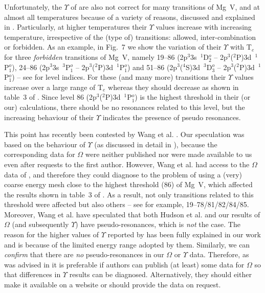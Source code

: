 \documentclass[fleqn]{article}
\begin{document}
Unfortunately, the $\Upsilon$ of \cite{sstmg5}  are also not correct for many transitions of Mg~V, and at almost all temperatures because of a variety of reasons, discussed and explained in \cite{mgv}. Particularly, at higher temperatures their $\Upsilon$ values increase with increasing temperature, irrespective of the (type of) transitions: allowed, inter-combination or forbidden. As an example, in Fig.~7 we show the variation of their $\Upsilon$ with T$_e$  for three {\em forbidden} transitions of Mg~V, namely 19--86 (2p$^3$3s~$^1$D$^o_2$ -- 2p$^3$($^2$P)3d~$^1$P$^o_1$),  24--86 (2p$^3$3s~$^3$P$^o_1$ -- 2p$^3$($^2$P)3d~$^1$P$^o_1$) and  51--86 (2p$^3$($^4$S)3d~$^3$D$^o_3$ -- 2p$^3$($^2$P)3d~$^1$P$^o_1$) -- see \cite{mgv} for level indices. For these (and many more) transitions their $\Upsilon$ values increase over a large range of T$_e$ whereas they should decrease as shown in table~3 of \cite{mgv}. Since level 86 (2p$^3$($^2$P)3d~$^1$P$^o_1$) is the highest threshold in their (or our) calculations, there should be no resonances related to this level, but the increasing behaviour of their $\Upsilon$ indicates the presence of pseudo resonances. 
 
This point has recently been contested by Wang et al. \cite{kbmgv}. Our speculation was based on the behaviour of $\Upsilon$ (as discussed in detail in \cite{mgv}), because the corresponding data for $\Omega$ were neither published nor were made available to us even after requests to the first author. However, Wang et al. \cite{kbmgv} had access to the $\Omega$ data of \cite{sstmg5}, and therefore they could diagnose to the problem of using a (very) coarse energy mesh close to the highest threshold (86)  of Mg~V, which affected the results shown in table~3 of \cite{mgv}. As a result,  not only transitions related to this threshold were affected but also others -- see for example, 19--78/81/82/84/85. Moreover, Wang et al. \cite{kbmgv} have speculated that both Hudson et al. \cite{hud} and our results \cite{mgv} of $\Omega$ (and subsequently $\Upsilon$) have pseudo-resonances, which is {\em not} the case. The reason for the higher values of $\Upsilon$ reported by \cite{hud} has been fully explained in our work \cite{mgv} and is because of the limited energy range adopted by them. Similarly, we can {\em confirm} that there are {\em no}  pseudo-resonances in our $\Omega$ or $\Upsilon$ data. Therefore, as was advised in \cite{fst} it is preferable if authors can publish (at least) some data for $\Omega$ so that differences in $\Upsilon$ results can be diagnosed. Alternatively, they should either make it available on a website  or should provide the data on request.
\end{document}
